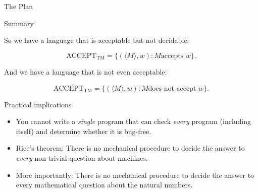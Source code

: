 \documentclass[12pt,compress]{beamer}
\begin{document}
\begin{frame}{The Plan}

  

\end{frame}

\begin{frame}{Summary}

  So we have a language that is acceptable but not decidable:

  \begin{equation*}
    \text{ACCEPT}_{\text{TM}} = \{ (\langle M \rangle, w) : M \text{
      accepts } w\}.
  \end{equation*}

  \vskip 0.15in

  And we have a language that is not even acceptable:

  \begin{equation*}
    \overline{\text{ACCEPT}_{\text{TM}}} = \{ (\langle M \rangle, w) : M \text{
      does not accept } w\}.
  \end{equation*}

\end{frame}

\begin{frame}{Practical implications}

  \begin{itemize}

  \item You cannot write a \textit{single} program that can check \textit{every}
    program (including itself) and determine whether it is bug-free.

  \item Rice's theorem: There is no mechanical procedure to decide the
    answer to \textit{every} non-trivial question about machines.

  \item More importantly: There is no mechanical procedure to decide the
    answer to every mathematical question about the natural numbers.

  \end{itemize}

\end{frame}
\end{document}
